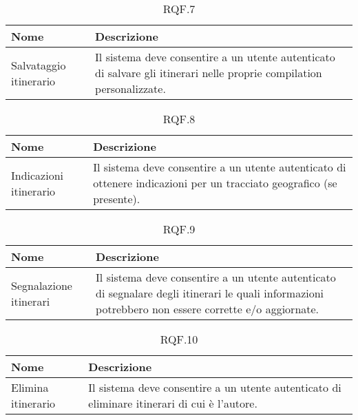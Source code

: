 \documentclass{natourDoc}
\begin{document}
	\begin{table}[H]
		\centering
		\begin{tabular}{ |p{5cm}|p{10.3cm}| }
			\hline
			\rowcolor{PineGreen!70}
			\textbf{Nome} & \textbf{Descrizione} \\
			\hline
			Salvataggio itinerario & Il sistema deve consentire a un utente autenticato di salvare gli itinerari
			nelle proprie compilation personalizzate. \\
			\hline
		\end{tabular}
		\caption{RQF.7}
		\label{table:7}
	\end{table}

	\begin{table}[H]
		\centering
		\begin{tabular}{ |p{5cm}|p{10.3cm}| }
			\hline
			\rowcolor{PineGreen!70}
			\textbf{Nome} & \textbf{Descrizione} \\
			\hline
			Indicazioni itinerario & Il sistema deve consentire a un utente autenticato di ottenere indicazioni
			per un tracciato geografico (se presente). \\
			\hline
		\end{tabular}
		\caption{RQF.8}
		\label{table:8}
	\end{table}

	\begin{table}[H]
		\centering
		\begin{tabular}{ |p{5cm}|p{10.3cm}| }
			\hline
			\rowcolor{PineGreen!70}
			\textbf{Nome} & \textbf{Descrizione} \\
			\hline
			Segnalazione itinerari & Il sistema deve consentire a un utente autenticato di segnalare degli itinerari
			le quali informazioni potrebbero non essere corrette e/o aggiornate. \\
			\hline
		\end{tabular}
		\caption{RQF.9}
		\label{table:9}
	\end{table}

	\begin{table}[H]
		\centering
		\begin{tabular}{ |p{5cm}|p{10.3cm}| }
			\hline
			\rowcolor{PineGreen!70}
			\textbf{Nome} & \textbf{Descrizione} \\
			\hline
			Elimina itinerario & Il sistema deve consentire a un utente autenticato di eliminare itinerari di cui
			è l'autore. \\
			\hline
		\end{tabular}
		\caption{RQF.10}
		\label{table:10}
	\end{table}
	
\end{document}
